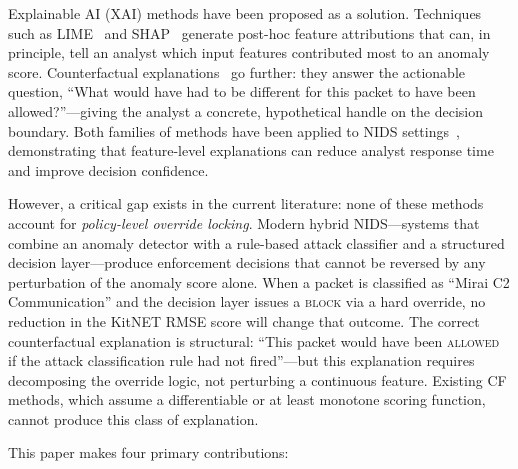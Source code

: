 \documentclass[preprint,12pt,authoryear]{elsarticle}
\begin{document}
Explainable AI (XAI) methods have been proposed as a solution. Techniques such
as LIME~\citep{Ribeiro2016} and SHAP~\citep{Lundberg2017} generate post-hoc
feature attributions that can, in principle, tell an analyst which input
features contributed most to an anomaly score. Counterfactual
explanations~\citep{Wachter2018} go further: they answer the actionable
question, ``What would have had to be different for this packet to have been
allowed?''---giving the analyst a concrete, hypothetical handle on the decision
boundary. Both families of methods have been applied to NIDS
settings~\citep{Antwarg2021,Wang2022}, demonstrating that feature-level
explanations can reduce analyst response time and improve decision confidence.

However, a critical gap exists in the current literature: none of these methods
account for \emph{policy-level override locking}. Modern hybrid
NIDS---systems that combine an anomaly detector with a rule-based attack
classifier and a structured decision layer---produce enforcement decisions that
cannot be reversed by any perturbation of the anomaly score alone. When a
packet is classified as ``Mirai C2 Communication'' and the decision layer issues
a \textsc{block} via a hard override, no reduction in the KitNET RMSE score will
change that outcome. The correct counterfactual explanation is structural: ``This
packet would have been \textsc{allowed} if the attack classification rule had not
fired''---but this explanation requires decomposing the override logic, not
perturbing a continuous feature. Existing CF methods, which assume a
differentiable or at least monotone scoring function, cannot produce this class
of explanation.

This paper makes four primary contributions:
\end{document}
